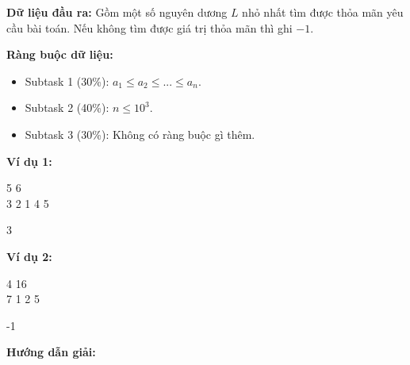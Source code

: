 \documentclass[12pt]{scrartcl}  %
\begin{document}
\textbf{Dữ liệu đầu ra:}
Gồm một số nguyên dương $L$ nhỏ nhất tìm được thỏa mãn yêu cầu bài toán. Nếu không tìm được giá trị thỏa mãn thì ghi $-1$.

\textbf{Ràng buộc dữ liệu:}
\begin{itemize}
    \item Subtask 1 (30\%): $a_1 \leq a_2 \leq ... \leq a_n$.
    \item Subtask 2 (40\%): $n \leq 10^3$.
    \item Subtask 3 (30\%): Không có ràng buộc gì thêm.
\end{itemize}

\textbf{Ví dụ 1:}
\begin{tcolorbox}[colback=gray!5!white, colframe=blue!50!black, title=Input]
5 6\\
3 2 1 4 5
\end{tcolorbox}
\begin{tcolorbox}[colback=gray!5!white, colframe=green!50!black, title=Output]
3
\end{tcolorbox}

\textbf{Ví dụ 2:}
\begin{tcolorbox}[colback=gray!5!white, colframe=blue!50!black, title=Input]
4 16\\
7 1 2 5
\end{tcolorbox}
\begin{tcolorbox}[colback=gray!5!white, colframe=green!50!black, title=Output]
-1
\end{tcolorbox}

\textbf{Hướng dẫn giải:}
\end{document}
